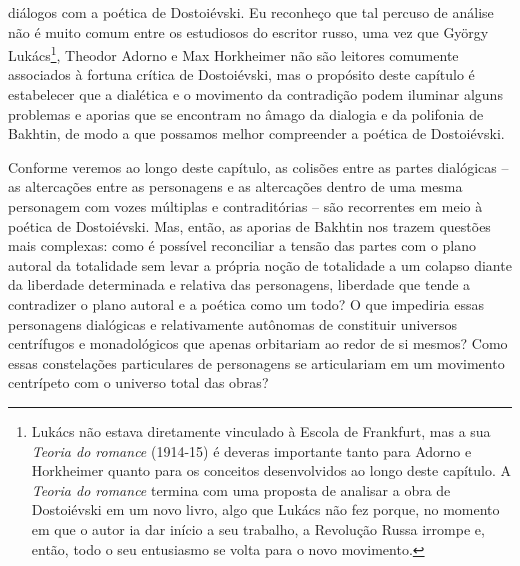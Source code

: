 diálogos com a poética de Dostoiévski. Eu reconheço que tal percuso de
análise não é muito comum entre os estudiosos do escritor russo, uma vez
que György Lukács\footnote{Lukács não estava diretamente vinculado à
  Escola de Frankfurt, mas a sua \emph{Teoria do romance} (1914-15) é
  deveras importante tanto para Adorno e Horkheimer quanto para os
  conceitos desenvolvidos ao longo deste capítulo. A \emph{Teoria do
  romance} termina com uma proposta de analisar a obra de Dostoiévski em
  um novo livro, algo que Lukács não fez porque, no momento em que o
  autor ia dar início a seu trabalho, a Revolução Russa irrompe e,
  então, todo o seu entusiasmo se volta para o novo movimento.}, Theodor
Adorno e Max Horkheimer não são leitores comumente associados à fortuna
crítica de Dostoiévski, mas o propósito deste capítulo é estabelecer que
a dialética e o movimento da contradição podem iluminar alguns problemas
e aporias que se encontram no âmago da dialogia e da polifonia de
Bakhtin, de modo a que possamos melhor compreender a poética de
Dostoiévski.

Conforme veremos ao longo deste capítulo, as colisões entre as partes
dialógicas -- as altercações entre as personagens e as altercações
dentro de uma mesma personagem com vozes múltiplas e contraditórias --
são recorrentes em meio à poética de Dostoiévski. Mas, então, as aporias
de Bakhtin nos trazem questões mais complexas: como é possível
reconciliar a tensão das partes com o plano autoral da totalidade sem
levar a própria noção de totalidade a um colapso diante da liberdade
determinada e relativa das personagens, liberdade que tende a
contradizer o plano autoral e a poética como um todo? O que impediria
essas personagens dialógicas e relativamente autônomas de constituir
universos centrífugos e monadológicos que apenas orbitariam ao redor de
si mesmos? Como essas constelações particulares de personagens se
articulariam em um movimento centrípeto com o universo total das obras?

